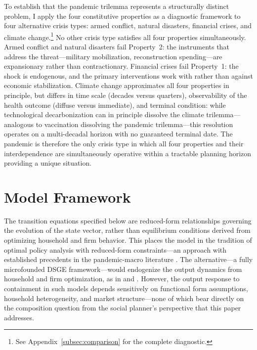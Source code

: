 \documentclass[12pt, a4paper]{article}
\begin{document}
To establish that the pandemic trilemma represents a structurally distinct problem, I apply the four constitutive properties as a diagnostic framework to four alternative crisis types: armed conflict, natural disasters, financial crises, and climate change.\footnote{See Appendix~\ref{subsec:comparison} for the complete diagnostic.} No other crisis type satisfies all four properties simultaneously. Armed conflict and natural disasters fail Property~2: the instruments that address the threat---military mobilization, reconstruction spending---are expansionary rather than contractionary. Financial crises fail Property~1: the shock is endogenous, and the primary interventions work with rather than against economic stabilization. Climate change approximates all four properties in principle, but differs in time scale (decades versus quarters), observability of the health outcome (diffuse versus immediate), and terminal condition: while technological decarbonization can in principle dissolve the climate trilemma---analogous to vaccination dissolving the pandemic trilemma---this resolution operates on a multi-decadal horizon with no guaranteed terminal date. The pandemic is therefore the only crisis type in which all four properties and their interdependence are simultaneously operative within a tractable planning horizon providing a unique situation.


\section{Model Framework}
\label{sec:model}

The transition equations specified below are reduced-form relationships governing the
evolution of the state vector, rather than equilibrium conditions derived from
optimizing household and firm behavior. This places the model in the tradition of
optimal policy analysis with reduced-form constraints---an approach with established
precedents in the pandemic-macro literature \citep{alvarez2020, acemoglu2021}. The alternative---a fully microfounded DSGE framework---would endogenize the output dynamics from household and firm optimization, as in \citet{eichenbaum2021macro} and \citet{KaplanMollViolante2020}. However, the output response to containment in such models depends sensitively on functional form assumptions, household heterogeneity, and market structure---none of which bear directly on the composition question from the social planner's perspective that this paper addresses.
 
\end{document}
